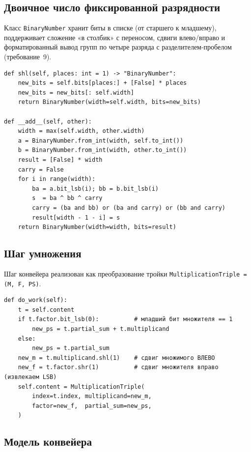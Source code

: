 \documentclass[12pt,a4paper]{article}
\begin{document}
\subsection{Двоичное число фиксированной разрядности}

Класс \texttt{BinaryNumber} хранит биты в списке (от старшего
к младшему), поддерживает сложение «в столбик» с переносом,
сдвиги влево/вправо и форматированный вывод групп по четыре
разряда с разделителем-пробелом (требование~9).

\begin{lstlisting}[caption={Фрагмент \texttt{binary\_number.py}}]
def shl(self, places: int = 1) -> "BinaryNumber":
    new_bits = self.bits[places:] + [False] * places
    new_bits = new_bits[: self.width]
    return BinaryNumber(width=self.width, bits=new_bits)

def __add__(self, other):
    width = max(self.width, other.width)
    a = BinaryNumber.from_int(width, self.to_int())
    b = BinaryNumber.from_int(width, other.to_int())
    result = [False] * width
    carry = False
    for i in range(width):
        ba = a.bit_lsb(i); bb = b.bit_lsb(i)
        s  = ba ^ bb ^ carry
        carry = (ba and bb) or (ba and carry) or (bb and carry)
        result[width - 1 - i] = s
    return BinaryNumber(width=width, bits=result)
\end{lstlisting}

\subsection{Шаг умножения}

Шаг конвейера реализован как преобразование тройки
\texttt{MultiplicationTriple = (M, F, PS)}.

\begin{lstlisting}[caption={Шаг конвейера (\texttt{pipeline.py})}]
def do_work(self):
    t = self.content
    if t.factor.bit_lsb(0):          # младший бит множителя == 1
        new_ps = t.partial_sum + t.multiplicand
    else:
        new_ps = t.partial_sum
    new_m = t.multiplicand.shl(1)    # сдвиг множимого ВЛЕВО
    new_f = t.factor.shr(1)          # сдвиг множителя вправо (извлекаем LSB)
    self.content = MultiplicationTriple(
        index=t.index, multiplicand=new_m,
        factor=new_f,  partial_sum=new_ps,
    )
\end{lstlisting}

\subsection{Модель конвейера}
\end{document}
